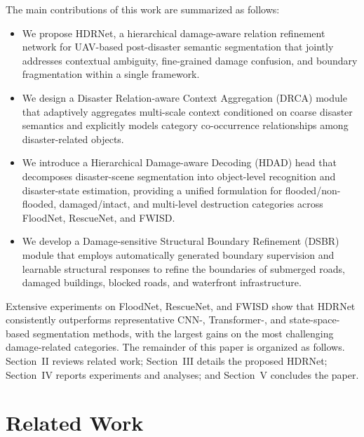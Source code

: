 \documentclass[lettersize,journal]{IEEEtran}
\begin{document}
The main contributions of this work are summarized as follows:
\begin{itemize}
\item We propose HDRNet, a hierarchical damage-aware relation refinement network for UAV-based post-disaster semantic segmentation that jointly addresses contextual ambiguity, fine-grained damage confusion, and boundary fragmentation within a single framework.
\item We design a Disaster Relation-aware Context Aggregation (DRCA) module that adaptively aggregates multi-scale context conditioned on coarse disaster semantics and explicitly models category co-occurrence relationships among disaster-related objects.
\item We introduce a Hierarchical Damage-aware Decoding (HDAD) head that decomposes disaster-scene segmentation into object-level recognition and disaster-state estimation, providing a unified formulation for flooded/non-flooded, damaged/intact, and multi-level destruction categories across FloodNet, RescueNet, and FWISD.
\item We develop a Damage-sensitive Structural Boundary Refinement (DSBR) module that employs automatically generated boundary supervision and learnable structural responses to refine the boundaries of submerged roads, damaged buildings, blocked roads, and waterfront infrastructure.
\end{itemize}

Extensive experiments on FloodNet, RescueNet, and FWISD show that HDRNet consistently outperforms representative CNN-, Transformer-, and state-space-based segmentation methods, with the largest gains on the most challenging damage-related categories. The remainder of this paper is organized as follows. Section~II reviews related work; Section~III details the proposed HDRNet; Section~IV reports experiments and analyses; and Section~V concludes the paper.

\section{Related Work}
\end{document}
